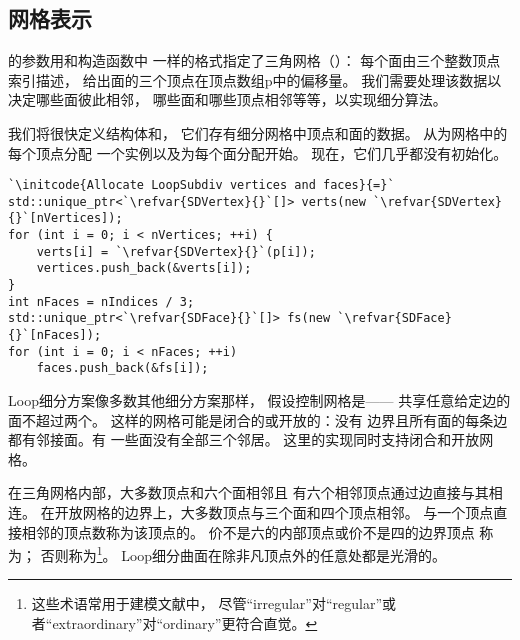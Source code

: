 \subsection{网格表示}\label{sub:网格表示}
的参数用和构造函数中
一样的格式指定了三角网格（）：
每个面由三个整数顶点索引描述，
给出面的三个顶点在顶点数组{\ttfamily p}中的偏移量。
我们需要处理该数据以决定哪些面彼此相邻，
哪些面和哪些顶点相邻等等，以实现细分算法。

我们将很快定义结构体和，
它们存有细分网格中顶点和面的数据。
从为网格中的每个顶点分配
一个实例以及为每个面分配开始。
现在，它们几乎都没有初始化。
\begin{lstlisting}
`\initcode{Allocate LoopSubdiv vertices and faces}{=}`
std::unique_ptr<`\refvar{SDVertex}{}`[]> verts(new `\refvar{SDVertex}{}`[nVertices]);
for (int i = 0; i < nVertices; ++i) {
    verts[i] = `\refvar{SDVertex}{}`(p[i]);
    vertices.push_back(&verts[i]);
}
int nFaces = nIndices / 3;
std::unique_ptr<`\refvar{SDFace}{}`[]> fs(new `\refvar{SDFace}{}`[nFaces]);
for (int i = 0; i < nFaces; ++i)
    faces.push_back(&fs[i]);
\end{lstlisting}

Loop细分方案像多数其他细分方案那样，
假设控制网格是——
共享任意给定边的面不超过两个。
这样的网格可能是闭合的或开放的：没有
边界且所有面的每条边都有邻接面。有
一些面没有全部三个邻居。
这里的实现同时支持闭合和开放网格。

在三角网格内部，大多数顶点和六个面相邻且
有六个相邻顶点通过边直接与其相连。
在开放网格的边界上，大多数顶点与三个面和四个顶点相邻。
与一个顶点直接相邻的顶点数称为该顶点的。
价不是六的内部顶点或价不是四的边界顶点
称为；
否则称为\footnote{这些术语常用于建模文献中，
    尽管“irregular”对“regular”或者“extraordinary”对“ordinary”更符合直觉。}。
Loop细分曲面在除非凡顶点外的任意处都是光滑的。


